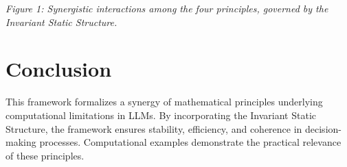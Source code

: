 \documentclass[12pt]{article}
\begin{document}
\textit{Figure 1: Synergistic interactions among the four principles, governed by the Invariant Static Structure.}

\section{Conclusion}
This framework formalizes a synergy of mathematical principles underlying computational limitations in LLMs. By incorporating the Invariant Static Structure, the framework ensures stability, efficiency, and coherence in decision-making processes. Computational examples demonstrate the practical relevance of these principles.
\end{document}

